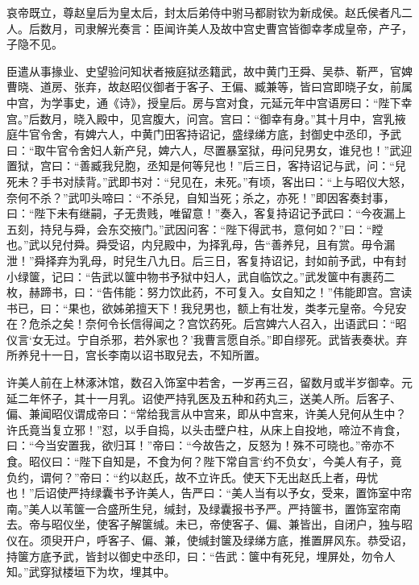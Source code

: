 \documentclass[12pt,UTF8]{ctexbook}
\begin{document}
哀帝既立，尊赵皇后为皇太后，封太后弟侍中驸马都尉钦为新成侯。赵氏侯者凡二人。后数月，司隶解光奏言：臣闻许美人及故中宫史曹宫皆御幸孝成皇帝，产子，子隐不见。



臣遣从事掾业、史望验问知状者掖庭狱丞籍武，故中黄门王舜、吴恭、靳严，官婢曹晓、道房、张弃，故赵昭仪御者于客子、王偏、臧兼等，皆曰宫即晓子女，前属中宫，为学事史，通《诗》，授皇后。房与宫对食，元延元年中宫语房曰：“陛下幸宫。”后数月，晓入殿中，见宫腹大，问宫。宫曰：“御幸有身。”其十月中，宫乳掖庭牛官令舍，有婢六人，中黄门田客持诏记，盛绿绨方底，封御史中丞印，予武曰：“取牛官令舍妇人新产兒，婢六人，尽置暴室狱，毋问兒男女，谁兒也！”武迎置狱，宫曰：“善臧我兒胞，丞知是何等兒也！”后三日，客持诏记与武，问：“兒死未？手书对牍背。”武即书对：“兒见在，未死。”有顷，客出曰：“上与昭仪大怒，奈何不杀？”武叩头啼曰：“不杀兒，自知当死；杀之，亦死！”即因客奏封事，曰：“陛下未有继嗣，子无贵贱，唯留意！”奏入，客复持诏记予武曰：“今夜漏上五刻，持兒与舜，会东交掖门。”武因问客：“陛下得武书，意何如？”曰：“瞠也。”武以兒付舜。舜受诏，内兒殿中，为择乳母，告“善养兒，且有赏。毋令漏泄！”舜择弃为乳母，时兒生八九日。后三日，客复持诏记，封如前予武，中有封小绿箧，记曰：“告武以箧中物书予狱中妇人，武自临饮之。”武发箧中有裹药二枚，赫蹄书，曰：“告伟能：努力饮此药，不可复入。女自知之！”伟能即宫。宫读书已，曰：“果也，欲姊弟擅天下！我兒男也，额上有壮发，类孝元皇帝。今兒安在？危杀之矣！奈何令长信得闻之？宫饮药死。后宫婢六人召入，出语武曰：“昭仪言‘女无过。宁自杀邪，若外家也？’我曹言愿自杀。”即自缪死。武皆表奏状。弃所养兒十一日，宫长李南以诏书取兒去，不知所置。



许美人前在上林涿沐馆，数召入饰室中若舍，一岁再三召，留数月或半岁御幸。元延二年怀子，其十一月乳。诏使严持乳医及五种和药丸三，送美人所。后客子、偏、兼闻昭仪谓成帝曰：“常给我言从中宫来，即从中宫来，许美人兒何从生中？许氏竟当复立邪！”怼，以手自捣，以头击壁户柱，从床上自投地，啼泣不肯食，曰：“今当安置我，欲归耳！”帝曰：“今故告之，反怒为！殊不可晓也。”帝亦不食。昭仪曰：“陛下自知是，不食为何？陛下常自言‘约不负女’，今美人有子，竟负约，谓何？”帝曰：“约以赵氏，故不立许氏。使天下无出赵氏上者，毋忧也！”后诏使严持绿囊书予许美人，告严曰：“美人当有以予女，受来，置饰室中帘南。”美人以苇箧一合盛所生兒，缄封，及绿囊报书予严。严持箧书，置饰室帘南去。帝与昭仪坐，使客子解箧缄。未已，帝使客子、偏、兼皆出，自闭户，独与昭仪在。须臾开户，呼客子、偏、兼，使缄封箧及绿绨方底，推置屏风东。恭受诏，持箧方底予武，皆封以御史中丞印，曰：“告武：箧中有死兒，埋屏处，勿令人知。”武穿狱楼垣下为坎，埋其中。
\end{document}
